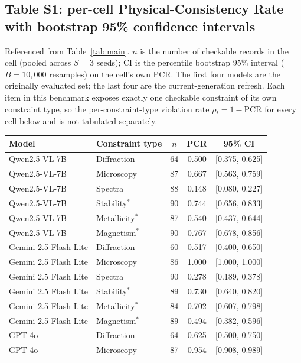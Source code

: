 \documentclass[pdflatex,sn-nature]{sn-jnl}
\begin{document}
\subsection*{Table S1: per-cell Physical-Consistency Rate with bootstrap 95\% confidence intervals}
Referenced from Table~\ref{tab:main}. $n$ is the number of checkable records in the cell
(pooled across $S=3$ seeds); CI is the percentile bootstrap 95\% interval ($B=10{,}000$
resamples) on the cell's own PCR. The first four models are the originally evaluated set;
the last four are the current-generation refresh. Each item in this benchmark exposes
exactly one checkable constraint of its own constraint type, so the per-constraint-type
violation rate $\rho_t=1-\mathrm{PCR}$ for every cell below and is not tabulated separately.
\begin{table}[h]
\centering
{\scriptsize\setlength{\tabcolsep}{4pt}\renewcommand{\arraystretch}{1.05}
\begin{tabular}{l l S[table-format=3.0] S[table-format=1.3] c}
\toprule
Model & Constraint type & {$n$} & {PCR} & {95\% CI} \\
\midrule
Qwen2.5-VL-7B & Diffraction & 64 & 0.500 & [0.375, 0.625] \\
Qwen2.5-VL-7B & Microscopy & 87 & 0.667 & [0.563, 0.759] \\
Qwen2.5-VL-7B & Spectra & 88 & 0.148 & [0.080, 0.227] \\
Qwen2.5-VL-7B & Stability$^{*}$ & 90 & 0.744 & [0.656, 0.833] \\
Qwen2.5-VL-7B & Metallicity$^{*}$ & 87 & 0.540 & [0.437, 0.644] \\
Qwen2.5-VL-7B & Magnetism$^{*}$ & 90 & 0.767 & [0.678, 0.856] \\
\addlinespace
Gemini 2.5 Flash Lite & Diffraction & 60 & 0.517 & [0.400, 0.650] \\
Gemini 2.5 Flash Lite & Microscopy & 86 & 1.000 & [1.000, 1.000] \\
Gemini 2.5 Flash Lite & Spectra & 90 & 0.278 & [0.189, 0.378] \\
Gemini 2.5 Flash Lite & Stability$^{*}$ & 89 & 0.730 & [0.640, 0.820] \\
Gemini 2.5 Flash Lite & Metallicity$^{*}$ & 84 & 0.702 & [0.607, 0.798] \\
Gemini 2.5 Flash Lite & Magnetism$^{*}$ & 89 & 0.494 & [0.382, 0.596] \\
\addlinespace
GPT-4o & Diffraction & 64 & 0.625 & [0.500, 0.750] \\
GPT-4o & Microscopy & 87 & 0.954 & [0.908, 0.989] \\

\end{tabular}}
\end{table}
\end{document}
